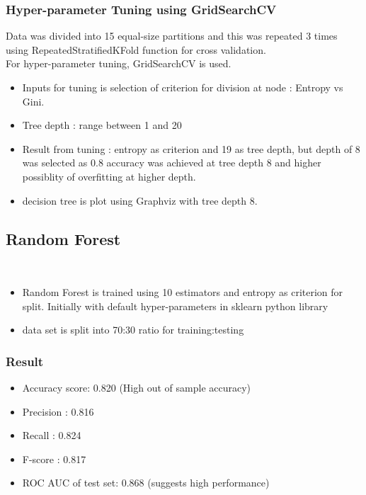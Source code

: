 \documentclass[12pt, letter]{article}
\begin{document}
\subsubsection{Hyper-parameter Tuning using GridSearchCV}
Data was divided into 15 equal-size partitions and this was repeated 3 times using RepeatedStratifiedKFold function for cross validation. \\

For hyper-parameter tuning, GridSearchCV is used. \\
\begin{itemize}
    \item Inputs for tuning is selection of criterion for division at node : Entropy vs Gini. 
    \item Tree depth : range between 1 and 20 
    \item Result from tuning : entropy as criterion and 19 as tree depth, but depth of 8 was selected as 0.8 accuracy was achieved at tree depth 8 and higher possiblity of overfitting at higher depth. 
    \item decision tree is plot using Graphviz with tree depth 8. 
\end{itemize}

\subsection{Random Forest} \\ 
\begin{itemize}
    \item Random Forest is trained using 10 estimators and entropy as criterion for split. Initially with default hyper-parameters in sklearn python library  
    \item data set is split into 70:30 ratio for training:testing 
\end{itemize}

\subsubsection{Result}
\begin{itemize}
    \item Accuracy score: 0.820 (High out of sample accuracy)
    \item Precision : 0.816 
    \item Recall : 0.824 
    \item F-score : 0.817
    \item ROC AUC of test set: 0.868 (suggests high performance)
\end{itemize}
\end{document}

